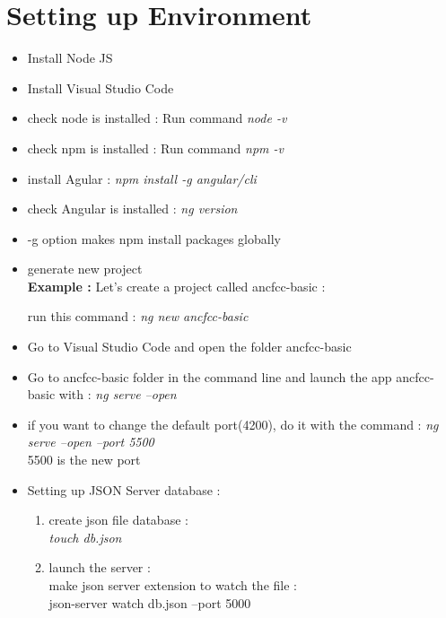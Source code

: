 \documentclass{article}
\begin{document}
\section{Setting up Environment}
\begin{itemize}
    \item Install Node JS
    \item Install Visual Studio Code
    \item check node is installed : Run command \textit{node -v}
    \item check npm is installed : Run command \textit{npm -v}
    \item install Agular :  \textit{npm install -g angular/cli} 
    \item check Angular is installed : \textit{ng version} 
    \item -g option makes npm install packages globally
    \item generate new project
    \\ \textbf{Example : } Let's create a project called ancfcc-basic :
    
     run this command : \textit{ng new ancfcc-basic}
    \item Go to Visual Studio Code and open the folder ancfcc-basic
    \item Go to ancfcc-basic folder in the command line and launch the app ancfcc-basic with : \textit{ng serve --open}
    \item if you want to change the default port(4200), do it with the command : \textit{ng serve --open --port 5500}
    \\5500 is the new port
    \item Setting up JSON Server database :
    \begin{enumerate}
        \item create json file database : 
        \\ \textit{touch db.json}
        \item launch the server : 
        \\ make json server extension to watch the file : 
        \\ json-server watch db.json --port 5000
    \end{enumerate}
    
\end{itemize}
\end{document}
